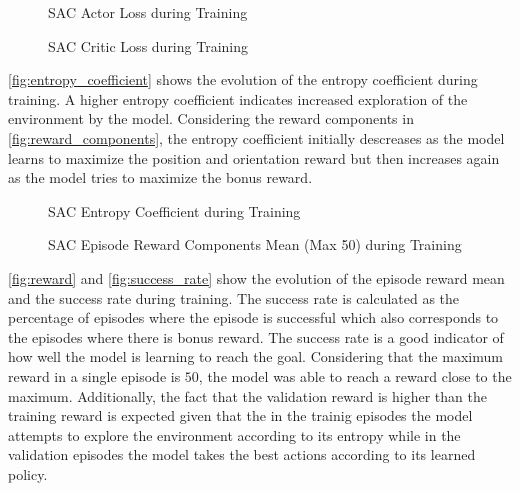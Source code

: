 \begin{figure}[H]%
    \centering
    {\fontsize{8}{11}\selectfont}
    \caption{SAC Actor Loss during Training}
    \label{fig:actor_loss}
\end{figure}

\begin{figure}[H]%
    \centering
    {\fontsize{8}{11}\selectfont}
    \caption{SAC Critic Loss during Training}
    \label{fig:critic_loss}
\end{figure}

\autoref{fig:entropy_coefficient} shows the evolution of the entropy coefficient during training. A higher entropy coefficient indicates increased exploration of the environment by the model. Considering the reward components in \autoref{fig:reward_components}, the entropy coefficient initially descreases as the model learns to maximize the position and orientation reward but then increases again as the model tries to maximize the bonus reward.

\begin{figure}[H]%
    \centering
    {\fontsize{8}{11}\selectfont}
    \caption{SAC Entropy Coefficient during Training}
    \label{fig:entropy_coefficient}
\end{figure}

\begin{figure}[H]%
    \centering
    {\fontsize{8}{11}\selectfont}
    \caption{SAC Episode Reward Components Mean (Max 50) during Training}
    \label{fig:reward_components}
\end{figure}

\autoref{fig:reward} and \autoref{fig:success_rate} show the evolution of the episode reward mean and the success rate during training. The success rate is calculated as the percentage of episodes where the episode is successful which also corresponds to the episodes where there is bonus reward. The success rate is a good indicator of how well the model is learning to reach the goal. Considering that the maximum reward in a single episode is $50$, the model was able to reach a reward close to the maximum. Additionally, the fact that the validation reward is higher than the training reward is expected given that the in the trainig episodes the model attempts to explore the environment according to its entropy while in the validation episodes the model takes the best actions according to its learned policy.

